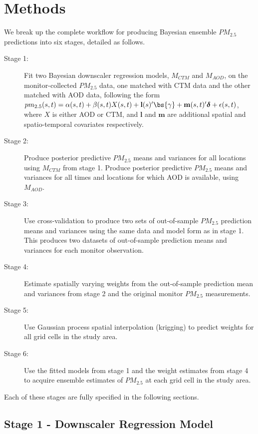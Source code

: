 
\section*{Methods}

We break up the complete workflow for producing Bayesian ensemble $PM_{2.5}$ predictions into six stages, detailed as follows. 

\begin{description}
    \item[Stage 1:] Fit two Bayesian downscaler regression models, $M_{CTM}$ and $M_{AOD}$, on the monitor-collected $PM_{2.5}$ data, one matched with CTM data and the other matched with AOD data, following the form $pm_{2.5}(s,t) = \alpha(s, t) + \beta(s, t) X(s, t) + \mathbf{l}(s)' \bs{\gamma} +  \mathbf{m}(s, t)' \boldsymbol{\delta} + \epsilon(s, t)$, where $X$ is either AOD or CTM, and $\mathbf{l}$ and $\mathbf{m}$ are additional spatial and spatio-temporal covariates respectively. 
    \item[Stage 2:] Produce posterior predictive $PM_{2.5}$ means and variances for all locations using $M_{CTM}$ from stage 1. Produce posterior predictive $PM_{2.5}$ means and variances for all times and locations for which AOD is available, using $M_{AOD}$. 
    \item[Stage 3:] Use cross-validation to produce two sets of out-of-sample $PM_{2.5}$ prediction means and variances using the same data and model form as in stage 1. This produces two datasets of out-of-sample prediction means and variances for each monitor observation.
    \item[Stage 4:] Estimate spatially varying weights from the out-of-sample prediction mean and variances from stage 2 and the original monitor $PM_{2.5}$ measurements. 
    \item[Stage 5:] Use Gaussian process spatial interpolation (krigging) to predict weights for all grid cells in the study area. 
    \item[Stage 6:] Use the fitted models from stage 1 and the weight estimates from stage 4 to acquire ensemble estimates of $PM_{2.5}$ at each grid cell in the study area. 
\end{description}

\noindent Each of these stages are fully specified in the following sections.

\subsection*{Stage 1 - Downscaler Regression Model}

